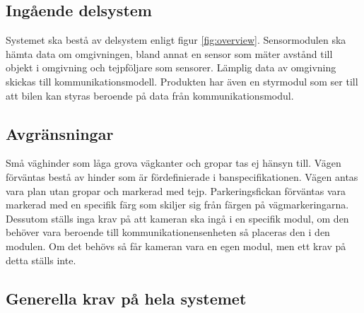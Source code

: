 \documentclass[kravspec/krav.tex]{subfiles}
\begin{document}
\subsection{Ingående delsystem}
Systemet ska bestå av delsystem enligt figur \ref{fig:overview}. Sensormodulen
ska hämta data om omgivningen, bland annat en sensor som mäter avstånd till
objekt i omgivning och tejpföljare som sensorer. Lämplig data av omgivning
skickas till kommunikationsmodell. Produkten har även en styrmodul som ser till
att bilen kan styras beroende på data från kommunikationsmodul.

\subsection{Avgränsningar}
Små väghinder som låga grova vägkanter och gropar tas ej hänsyn till. Vägen
förväntas bestå av hinder som är fördefinierade i banspecifikationen. Vägen
antas vara plan utan gropar och markerad med tejp. Parkeringsfickan förväntas
vara markerad med en specifik färg som skiljer sig från färgen på
vägmarkeringarna. Dessutom ställs inga krav på att kameran ska ingå i en
specifik modul, om den behöver vara beroende till kommunikationensenheten så
placeras den i den modulen. Om det behövs så får kameran vara en egen modul,
men ett krav på detta ställs inte.


\subsection{Generella krav på hela systemet}
\end{document}
